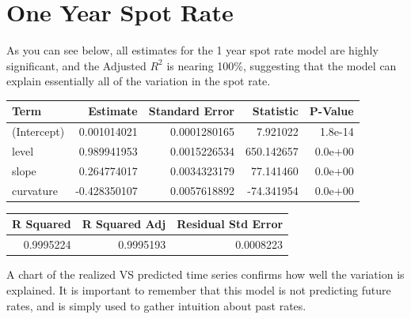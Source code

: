 \documentclass[]{book}
\theoremstyle{definition}
\theoremstyle{definition}
\theoremstyle{definition}
\theoremstyle{remark}
\begin{document}
\hypertarget{one-year-spot-rate}{%
\section{One Year Spot Rate}\label{one-year-spot-rate}}

As you can see below, all estimates for the 1 year spot rate model are
highly significant, and the Adjusted \(R^2\) is nearing 100\%,
suggesting that the model can explain essentially all of the variation
in the spot rate.

\begin{tabular}{l|r|r|r|r}
\hline
Term & Estimate & Standard Error & Statistic & P-Value\\
\hline
(Intercept) & 0.001014021 & 0.0001280165 & 7.921022 & 1.8e-14\\
\hline
level & 0.989941953 & 0.0015226534 & 650.142657 & 0.0e+00\\
\hline
slope & 0.264774017 & 0.0034323179 & 77.141460 & 0.0e+00\\
\hline
curvature & -0.428350107 & 0.0057618892 & -74.341954 & 0.0e+00\\
\hline
\end{tabular}

\begin{tabular}{r|r|r}
\hline
R Squared & R Squared Adj & Residual Std Error\\
\hline
0.9995224 & 0.9995193 & 0.0008223\\
\hline
\end{tabular}

A chart of the realized VS predicted time series confirms how well the
variation is explained. It is important to remember that this model is
not predicting future rates, and is simply used to gather intuition
about past rates.
\end{document}
